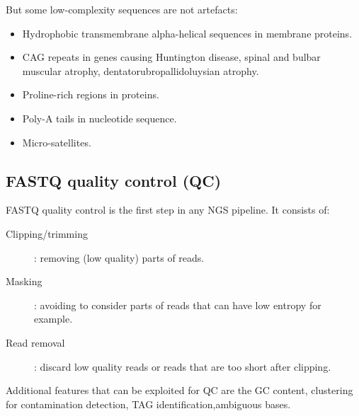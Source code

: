 	But some low-complexity sequences are not artefacts:

	\begin{multicols}{2}
		\begin{itemize}
			\item Hydrophobic transmembrane alpha-helical sequences in membrane proteins.
			\item CAG repeats in genes causing Huntington disease, spinal and bulbar muscular atrophy, dentatorubropallidoluysian atrophy.
			\item Proline-rich regions in proteins.
			\item Poly-A tails in nucleotide sequence.
			\item Micro-satellites.
		\end{itemize}
	\end{multicols}

	\subsection{FASTQ quality control (QC)}
	FASTQ quality control is the first step in any NGS pipeline.
	It consists of:

	\begin{multicols}{2}
		\begin{description}
			\item[Clipping/trimming]: removing (low quality) parts of reads.
			\item[Masking]: avoiding to consider parts of reads that can have low entropy for example.
			\item[Read removal]: discard low quality reads or reads that are too short after clipping.
		\end{description}
	\end{multicols}

	Additional features that can be exploited for QC are the GC content, clustering for contamination detection, TAG identification,ambiguous bases.
